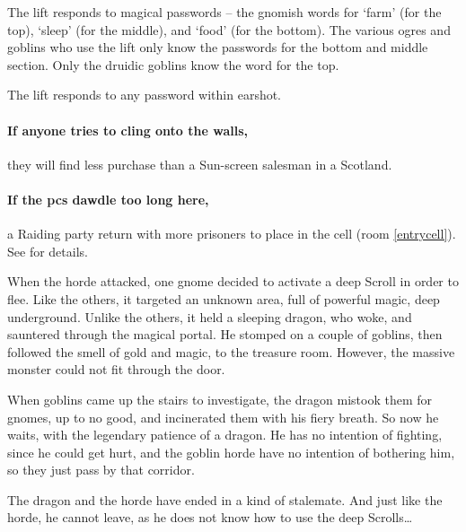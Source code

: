 \begin{multicols}{2}
\begin{boxtext}
\end{boxtext}

The lift responds to magical passwords -- the gnomish words for `farm' (for the top), `sleep' (for the middle), and `food' (for the bottom).
The various ogres and goblins who use the lift only know the passwords for the bottom and middle section.
Only the druidic goblins know the word for the top.

The lift responds to any password within earshot.

\paragraph{If anyone tries to cling onto the walls,}
they will find less purchase than a Sun-screen salesman in a Scotland.

\paragraph{If the \glspl{pc} dawdle too long here,}
a Raiding party return with more prisoners to place in the cell (room \ref{entrycell}).
See  for details.


\begin{exampletext}

  When the horde attacked, one gnome decided to activate a \Gls{deep} Scroll in order to flee.
  Like the others, it targeted an unknown area, full of powerful magic, deep underground.
  Unlike the others, it held a sleeping dragon, who woke, and sauntered through the magical portal.
  He stomped on a couple of goblins, then followed the smell of gold and magic, to the treasure room.
  However, the massive monster could not fit through the door.

  When goblins came up the stairs to investigate, the dragon mistook them for gnomes, up to no good, and incinerated them with his fiery breath.
  So now he waits, with the legendary patience of a dragon.
  He has no intention of fighting, since he could get hurt, and the goblin horde have no intention of bothering him, so they just pass by that corridor.

  The dragon and the horde have ended in a kind of stalemate.
  And just like the horde, he cannot leave, as he does not know how to use the \Gls{deep} Scrolls\ldots

\end{exampletext}


\end{multicols}
